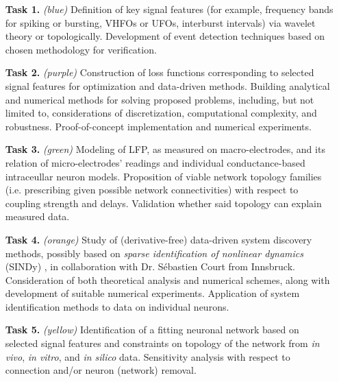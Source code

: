 \documentclass[a4paper,11pt]{scrartcl}
\begin{document}
\begin{itemize}
    \item[\textbf{Task 1.}] \textit{(blue)} Definition of key signal features (for example, frequency bands for spiking or bursting, VHFOs or UFOs, interburst intervals) via wavelet theory or topologically. Development of event detection techniques based on chosen methodology for verification.
    
    \item[\textbf{Task 2.}] \textit{(purple)} Construction of loss functions corresponding to selected signal features for optimization and data-driven methods. Building analytical and numerical methods for solving proposed problems, including, but not limited to, considerations of discretization, computational complexity, and robustness. Proof-of-concept implementation and numerical experiments.

    \item[\textbf{Task 3.}] \textit{(green)} Modeling of LFP, as measured \cite{Brazdil2017} on macro-electrodes, and its relation of micro-electrodes' readings and individual conductance-based intraceullar neuron models. Proposition of viable network topology families (i.e. prescribing given possible network connectivities) with respect to coupling strength and delays. Validation whether said topology can explain measured data.
    
    \item[\textbf{Task 4.}] \textit{(orange)} Study of (derivative-free) data-driven system discovery methods, possibly based on \textit{sparse identification of nonlinear dynamics} (SINDy) \cite{Brunton2016}, in collaboration with Dr. Sébastien Court from Innsbruck. Consideration of both theoretical analysis and numerical schemes, along with development of suitable numerical experiments. Application of system identification methods to data on individual neurons.

    \item[\textbf{Task 5.}] \textit{(yellow)} Identification of a fitting neuronal network based on selected signal features and constraints on topology of the network from \textit{in vivo}, \textit{in vitro}, and \textit{in silico} data. Sensitivity analysis with respect to connection and/or neuron (network) removal.

\end{itemize}
\end{document}
